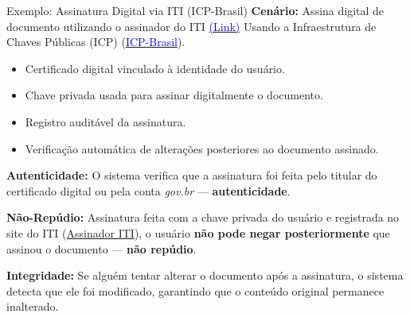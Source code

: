 \begin{frame}{Exemplo: Assinatura Digital via ITI (ICP-Brasil)} 
\textbf{Cenário:} Assina digital de documento utilizando o assinador do ITI \href{https://www.gov.br/iti/pt-br}{\textcolor{blue}{(Link)}}
Usando a Infraestrutura de Chaves Públicas (ICP) (\href{https://www.gov.br/iti/pt-br/assuntos/icp-brasil}{\textcolor{blue}{ICP-Brasil}}).


\begin{itemize}
    \item Certificado digital vinculado à identidade do usuário.
    \item Chave privada usada para assinar digitalmente o documento.
    \item Registro auditável da assinatura.
    \item Verificação automática de alterações posteriores ao documento assinado.
\end{itemize}

\medskip
\textbf{Autenticidade:}  
O sistema verifica que a assinatura foi feita pelo titular do certificado digital ou pela conta \textit{gov.br} 
— \textbf{autenticidade}.

\medskip
\textbf{Não-Repúdio:}  
Assinatura feita com a chave privada do usuário e registrada no site do ITI (\href{https://assinador.iti.br}{Assinador ITI}), o usuário \textbf{não pode negar posteriormente} que assinou o documento — \textbf{não repúdio}.

\medskip
\textbf{Integridade:}  
Se alguém tentar alterar o documento após a assinatura, o sistema detecta que ele foi modificado, garantindo que o conteúdo original permanece inalterado.



\end{frame}




